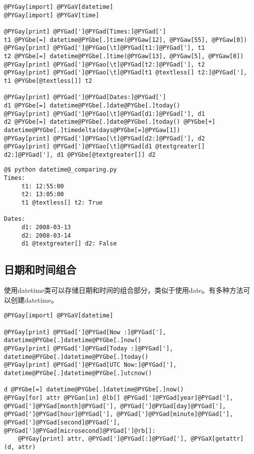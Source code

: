 \documentclass[a4paper,10pt,english]{manual}
\begin{document}
\begin{Verbatim}[commandchars=@\[\]]
@PYGay[import] @PYGaV[datetime]
@PYGay[import] @PYGaV[time]

@PYGay[print] @PYGad[']@PYGad[Times:]@PYGad[']
t1 @PYGbe[=] datetime@PYGbe[.]time(@PYGaw[12], @PYGaw[55], @PYGaw[0])
@PYGay[print] @PYGad[']@PYGao[\t]@PYGad[t1:]@PYGad['], t1
t2 @PYGbe[=] datetime@PYGbe[.]time(@PYGaw[13], @PYGaw[5], @PYGaw[0])
@PYGay[print] @PYGad[']@PYGao[\t]@PYGad[t2:]@PYGad['], t2
@PYGay[print] @PYGad[']@PYGao[\t]@PYGad[t1 @textless[] t2:]@PYGad['], t1 @PYGbe[@textless[]] t2

@PYGay[print] @PYGad[']@PYGad[Dates:]@PYGad[']
d1 @PYGbe[=] datetime@PYGbe[.]date@PYGbe[.]today()
@PYGay[print] @PYGad[']@PYGao[\t]@PYGad[d1:]@PYGad['], d1
d2 @PYGbe[=] datetime@PYGbe[.]date@PYGbe[.]today() @PYGbe[+] datetime@PYGbe[.]timedelta(days@PYGbe[=]@PYGaw[1])
@PYGay[print] @PYGad[']@PYGao[\t]@PYGad[d2:]@PYGad['], d2
@PYGay[print] @PYGad[']@PYGao[\t]@PYGad[d1 @textgreater[] d2:]@PYGad['], d1 @PYGbe[@textgreater[]] d2
\end{Verbatim}

\begin{Verbatim}[commandchars=@\[\]]
@$ python datetime@_comparing.py
Times:
     t1: 12:55:00
     t2: 13:05:00
     t1 @textless[] t2: True

Dates:
     d1: 2008-03-13
     d2: 2008-03-14
     d1 @textgreater[] d2: False
\end{Verbatim}


\subsection{日期和时间组合}

使用datetime类可以存储日期和时间的组合部分，类似于使用date。有多种方法可以创建datetime。

\begin{Verbatim}[commandchars=@\[\]]
@PYGay[import] @PYGaV[datetime]

@PYGay[print] @PYGad[']@PYGad[Now :]@PYGad['], datetime@PYGbe[.]datetime@PYGbe[.]now()
@PYGay[print] @PYGad[']@PYGad[Today :]@PYGad['], datetime@PYGbe[.]datetime@PYGbe[.]today()
@PYGay[print] @PYGad[']@PYGad[UTC Now:]@PYGad['], datetime@PYGbe[.]datetime@PYGbe[.]utcnow()

d @PYGbe[=] datetime@PYGbe[.]datetime@PYGbe[.]now()
@PYGay[for] attr @PYGan[in] @lb[] @PYGad[']@PYGad[year]@PYGad['], @PYGad[']@PYGad[month]@PYGad['], @PYGad[']@PYGad[day]@PYGad['], @PYGad[']@PYGad[hour]@PYGad['], @PYGad[']@PYGad[minute]@PYGad['], @PYGad[']@PYGad[second]@PYGad['], @PYGad[']@PYGad[microsecond]@PYGad[']@rb[]:
    @PYGay[print] attr, @PYGad[']@PYGad[:]@PYGad['], @PYGaX[getattr](d, attr)
\end{Verbatim}
\end{document}
